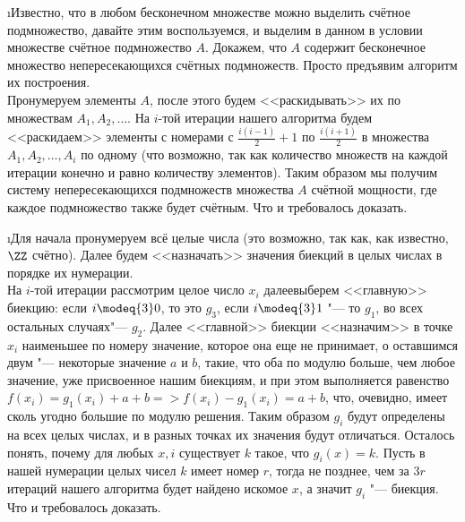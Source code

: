 \i Известно, что в любом бесконечном множестве можно выделить счётное подмножество, давайте этим воспользуемся, и выделим в данном в условии множестве счётное подмножество $A$. Докажем, что $A$ содержит бесконечное множество непересекающихся счётных подмножеств. Просто предъявим алгоритм их построения.\\
Пронумеруем элементы $A$, после этого будем <<раскидывать>> их по множествам $A_1, A_2, \ldots$. На $i$-той итерации нашего алгоритма будем <<раскидаем>> элементы с номерами с $\frac{i(i-1)}{2} + 1$ по $\frac{i(i+1)}{2}$ в множества $A_1, A_2, \ldots, A_i$ по одному (что возможно, так как количество множеств на каждой итерации конечно и равно количеству элементов). Таким образом мы получим систему непересекающихся подмножеств множества $A$ счётной мощности, где каждое подмножество также будет счётным. Что и требовалось доказать.

\i Для начала пронумеруем всё целые числа (это возможно, так как, как известно, $\ZZ$ счётно). Далее будем <<назначать>> значения биекций в целых числах в порядке их нумерации.\\
На $i$-той итерации рассмотрим целое число $x_i$ далеевыберем <<главную>> биекцию: если $i \modeq{3} 0$, то это $g_3$, если $i \modeq{3} 1$ "--- то $g_1$, во всех остальных случаях"--- $g_2$. Далее <<главной>> биекции <<назначим>> в точке $x_i$ наименьшее по номеру значение, которое она еще не принимает, о оставшимся двум "--- некоторые значение $a$ и $b$, такие, что оба по модулю больше, чем любое значение, уже присвоенное нашим биекциям, и при этом выполняется равенство $f(x_i) = g_1(x_i) + a + b => f(x_i) - g_1(x_i) = a + b$, что, очевидно, имеет сколь угодно большие по модулю решения. Таким образом $g_i$ будут определены на всех целых числах, и в разных точках их значения будут отличаться. Осталось понять, почему для любых $x, i$ существует $k$ такое, что $g_i(x) = k$. Пусть в нашей нумерации целых чисел $k$ имеет номер $r$, тогда не позднее, чем за $3r$ итераций нашего алгоритма будет найдено искомое $x$, а значит $g_i$ "--- биекция. Что и требовалось доказать.